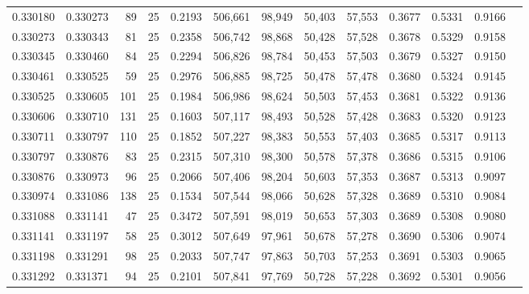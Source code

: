 \begin{tabular}{rrrrrrrrrrrrr}
0.330180 & 0.330273 &    89 &  25 &                                     0.2193 & 506,661 &  98,949 &  50,403 &  57,553 & 0.3677 & 0.5331 & 0.9166 \\
0.330273 & 0.330343 &    81 &  25 &                                     0.2358 & 506,742 &  98,868 &  50,428 &  57,528 & 0.3678 & 0.5329 & 0.9158 \\
0.330345 & 0.330460 &    84 &  25 &                                     0.2294 & 506,826 &  98,784 &  50,453 &  57,503 & 0.3679 & 0.5327 & 0.9150 \\
0.330461 & 0.330525 &    59 &  25 &                                     0.2976 & 506,885 &  98,725 &  50,478 &  57,478 & 0.3680 & 0.5324 & 0.9145 \\
0.330525 & 0.330605 &   101 &  25 &                                     0.1984 & 506,986 &  98,624 &  50,503 &  57,453 & 0.3681 & 0.5322 & 0.9136 \\
0.330606 & 0.330710 &   131 &  25 &                                     0.1603 & 507,117 &  98,493 &  50,528 &  57,428 & 0.3683 & 0.5320 & 0.9123 \\
0.330711 & 0.330797 &   110 &  25 &                                     0.1852 & 507,227 &  98,383 &  50,553 &  57,403 & 0.3685 & 0.5317 & 0.9113 \\
0.330797 & 0.330876 &    83 &  25 &                                     0.2315 & 507,310 &  98,300 &  50,578 &  57,378 & 0.3686 & 0.5315 & 0.9106 \\
0.330876 & 0.330973 &    96 &  25 &                                     0.2066 & 507,406 &  98,204 &  50,603 &  57,353 & 0.3687 & 0.5313 & 0.9097 \\
0.330974 & 0.331086 &   138 &  25 &                                     0.1534 & 507,544 &  98,066 &  50,628 &  57,328 & 0.3689 & 0.5310 & 0.9084 \\
0.331088 & 0.331141 &    47 &  25 &                                     0.3472 & 507,591 &  98,019 &  50,653 &  57,303 & 0.3689 & 0.5308 & 0.9080 \\
0.331141 & 0.331197 &    58 &  25 &                                     0.3012 & 507,649 &  97,961 &  50,678 &  57,278 & 0.3690 & 0.5306 & 0.9074 \\
0.331198 & 0.331291 &    98 &  25 &                                     0.2033 & 507,747 &  97,863 &  50,703 &  57,253 & 0.3691 & 0.5303 & 0.9065 \\
0.331292 & 0.331371 &    94 &  25 &                                     0.2101 & 507,841 &  97,769 &  50,728 &  57,228 & 0.3692 & 0.5301 & 0.9056 \\

\end{tabular}
